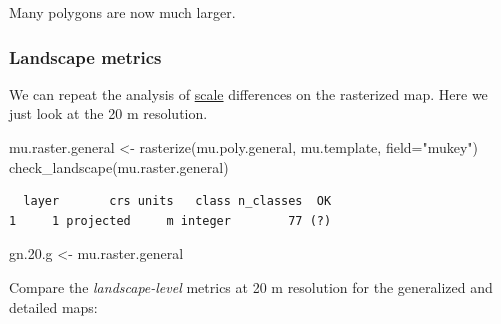 \documentclass[
  letterpaper,
  DIV=11,
  numbers=noendperiod]{scrartcl}
\newenvironment{Shaded}{\begin{snugshade}}{\end{snugshade}}
\newcommand{\AttributeTok}[1]{\textcolor[rgb]{0.40,0.45,0.13}{#1}}
\newcommand{\FloatTok}[1]{\textcolor[rgb]{0.68,0.00,0.00}{#1}}
\newcommand{\FunctionTok}[1]{\textcolor[rgb]{0.28,0.35,0.67}{#1}}
\newcommand{\NormalTok}[1]{\textcolor[rgb]{0.00,0.23,0.31}{#1}}
\newcommand{\OtherTok}[1]{\textcolor[rgb]{0.00,0.23,0.31}{#1}}
\newcommand{\SpecialCharTok}[1]{\textcolor[rgb]{0.37,0.37,0.37}{#1}}
\newcommand{\StringTok}[1]{\textcolor[rgb]{0.13,0.47,0.30}{#1}}
\begin{document}
Many polygons are now much larger.

\hypertarget{landscape-metrics}{%
\subsubsection{Landscape metrics}\label{landscape-metrics}}

We can repeat the analysis of \protect\hyperlink{scale}{scale}
differences on the rasterized map. Here we just look at the 20 m
resolution.

\begin{Shaded}
\begin{Highlighting}[]
\NormalTok{mu.raster.general }\OtherTok{\textless{}{-}} \FunctionTok{rasterize}\NormalTok{(mu.poly.general, mu.template, }\AttributeTok{field=}\StringTok{"mukey"}\NormalTok{)}
\FunctionTok{check\_landscape}\NormalTok{(mu.raster.general)}
\end{Highlighting}
\end{Shaded}

\begin{verbatim}
  layer       crs units   class n_classes  OK
1     1 projected     m integer        77 (?)
\end{verbatim}

\begin{Shaded}
\begin{Highlighting}[]
\NormalTok{gn.}\FloatTok{20.}\NormalTok{g }\OtherTok{\textless{}{-}}\NormalTok{ mu.raster.general}
\end{Highlighting}
\end{Shaded}

Compare the \emph{landscape-level} metrics at 20 m resolution for the
generalized and detailed maps:

\begin{Shaded}
\end{Shaded}
\end{document}
